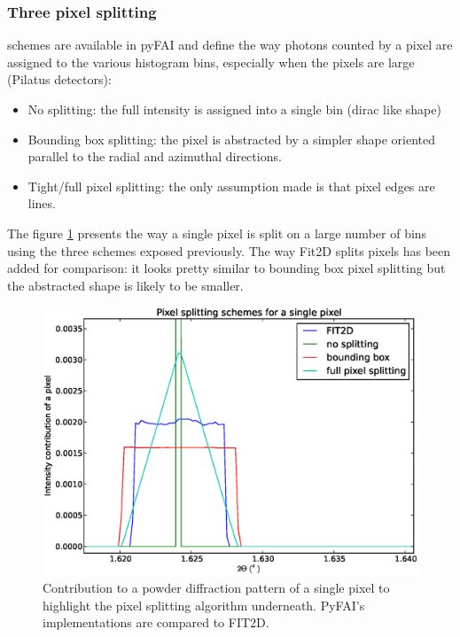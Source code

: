 \documentclass[preprint]{iucr}
\begin{document}
\subsubsection{Three pixel splitting} schemes are available in pyFAI and define
the way photons counted by a pixel are assigned to the various histogram bins,
especially when the pixels are large (Pilatus detectors):
\begin{itemize}
\item No splitting: the full intensity is assigned into a single bin (dirac
like shape)
\item Bounding box splitting: the pixel is abstracted by a simpler shape
oriented parallel to the radial and azimuthal directions.
\item
Tight/full pixel splitting: the only assumption made is that pixel
edges are lines.
\end{itemize}
The figure \ref{split} presents the way a single pixel is split on a
large number of bins using the three schemes exposed previously. The way Fit2D
splits pixels has been added for comparison: it looks pretty similar to bounding
box pixel splitting but the abstracted shape is likely to be smaller.

\begin{figure}
\label{split}
\begin{center}
\includegraphics[width=15cm]{splitpixel.eps}
\caption{Contribution to a powder diffraction pattern of a single pixel to
highlight the pixel splitting algorithm underneath. PyFAI's implementations are
compared to FIT2D.}
\end{center}
\end{figure}
\end{document}
